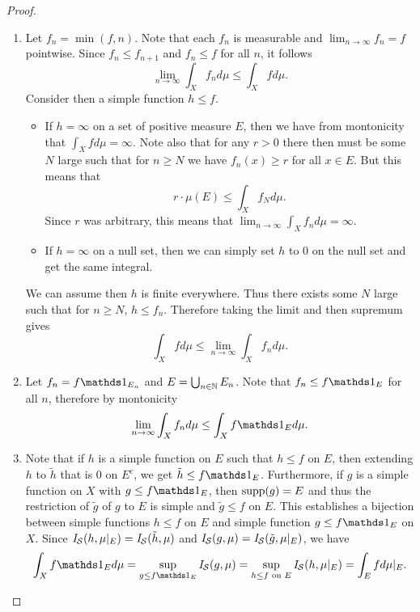 \documentclass[hw_all.tex]{subfiles}
\begin{document}
\begin{proof}
\begin{enumerate}
        \item[(ix)]
            Let $f_n = \min(f, n)$. Note that each $f_n$ is measurable and $\lim_{n \to \infty} f_n = f$ pointwise. Since $f_n \leq f_{n+1}$ and $f_n \leq f$ for all $n$, it follows
            \[
                \lim_{n \to \infty} \int_X f_n d \mu \leq \int_X f d \mu
            .\]
            Consider then a simple function $h \leq f$.
            \begin{itemize}
                \item 
                    If $h = \infty$ on a set of positive measure $E$, then we have from montonicity that $\int_X f d \mu = \infty$. Note also that for any $r > 0$ there then must be some $N$ large such that for $n \geq N$ we have $f_n(x) \geq r$ for all $x \in E$. But this means that
                    \[
                        r \cdot \mu(E) \leq \int_X f_N d \mu
                    .\]
                    Since $r$ was arbitrary, this means that $\lim_{n\to \infty} \int_X f_n d \mu = \infty$.

                \item
                    If $h = \infty$ on a null set, then we can simply set $h$ to $0$ on the null set and get the same integral.
            \end{itemize}

            We can assume then $h$ is finite everywhere. Thus there exists some $N$ large such that for $n \geq N$, $h \leq f_n$. Therefore taking the limit and then supremum gives 
            \[
                \int_X f d \mu \leq \lim_{n \to \infty} \int_X f_n d \mu
            .\]

        \item[(x)]
            Let $f_n = f \ind{E_n}$ and $E = \bigcup_{n \in \mathbb{N}} E_n$. Note that $f_n \leq f \ind{E}$ for all $n$, therefore by montonicity
            \[
                \lim_{n \to \infty} \int_X f_n d \mu \leq \int_X f \ind{E} d \mu
            .\]

        \item[(xi)]
            Note that if $h$ is a simple function on $E$ such that $h \leq f$ on $E$, then extending $h$ to $\tilde{h}$ that is $0$ on $E^c$, we get $\tilde{h} \leq f \ind{E}$. Furthermore, if $g$ is a simple function on $X$ with $g \leq f \ind{E}$, then $\operatorname{supp}(g) = E$ and thus the restriction of $\tilde{g}$ of $g$ to $E$ is simple and $\tilde{g} \leq f$ on $E$. This establishes a bijection between simple functions $h \leq f$ on $E$ and simple function $g \leq f \ind{E}$ on $X$. Since $\mathit{I}_{\mathcal{S}}(h, \mu\vert_E) = \mathit{I}_{\mathcal{S}}(\tilde{h}, \mu)$ and $\mathit{I}_{\mathcal{S}}(g, \mu) = \mathit{I}_{\mathcal{S}}(\tilde{g}, \mu\vert_E)$, we have
            \[
                \int_X f \ind{E} d \mu = \sup_{g \leq f \ind{E}} \sint(g, \mu) = \sup_{h \leq f \text{ on } E} \sint(h, \mu\vert_E) = \int_E f d \mu\vert_E
            .\]
    \end{enumerate}
\end{proof}
\end{document}
